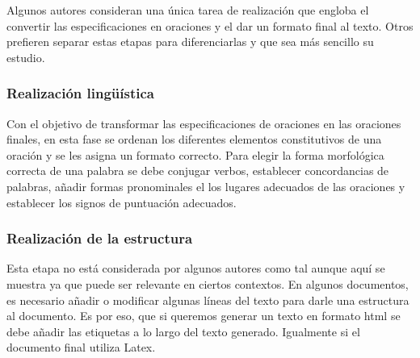 Algunos autores consideran una única tarea de realización que engloba el convertir las especificaciones en oraciones y el dar un formato final al texto. Otros prefieren separar estas etapas para diferenciarlas y que sea más sencillo su estudio.

\subsubsection{Realización lingüística}
Con el objetivo de transformar las especificaciones de oraciones en las oraciones finales, en esta fase se ordenan los diferentes elementos constitutivos de una oración y se les asigna un formato correcto. Para elegir la forma morfológica correcta de una palabra se debe conjugar verbos, establecer concordancias de palabras, añadir formas pronominales el los lugares adecuados de las oraciones y establecer los signos de puntuación adecuados. 

\subsubsection{Realización de la estructura}
Esta etapa no está considerada por algunos autores como tal aunque aquí se muestra ya que puede ser relevante en ciertos contextos. 
En algunos documentos, es necesario añadir o modificar algunas líneas del texto para darle una estructura al documento. Es por eso, que si queremos generar un texto en formato html se debe añadir las etiquetas a lo largo del texto generado. Igualmente si el documento final utiliza Latex.
